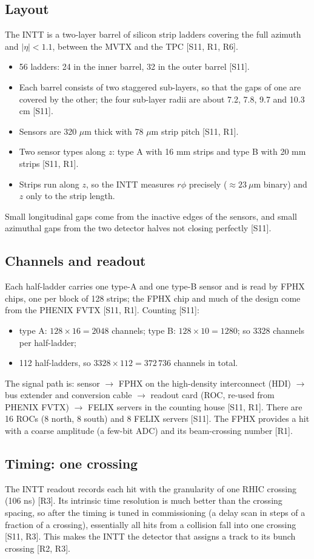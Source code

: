 \documentclass[11pt,letterpaper]{article}
\begin{document}
\subsection{Layout}
The INTT is a two-layer barrel of silicon strip ladders covering the full azimuth and $|\eta|<1.1$, between the MVTX and the TPC [S11, R1, R6].
\begin{itemize}
\item 56 ladders: 24 in the inner barrel, 32 in the outer barrel [S11].
\item Each barrel consists of two staggered sub-layers, so that the gaps of one are covered by the other; the four sub-layer radii are about 7.2, 7.8, 9.7 and 10.3 cm [S11].
\item Sensors are 320 $\mu$m thick with 78 $\mu$m strip pitch [S11, R1].
\item Two sensor types along $z$: type A with 16 mm strips and type B with 20 mm strips [S11, R1].
\item Strips run along $z$, so the INTT measures $r\phi$ precisely ($\approx23\ \mu$m binary) and $z$ only to the strip length.
\end{itemize}
Small longitudinal gaps come from the inactive edges of the sensors, and small azimuthal gaps from the two detector halves not closing perfectly [S11].

\subsection{Channels and readout}
Each half-ladder carries one type-A and one type-B sensor and is read by FPHX chips, one per block of 128 strips; the FPHX chip and much of the design come from the PHENIX FVTX [S11, R1].
Counting [S11]:
\begin{itemize}
\item type A: $128\times16=2048$ channels; type B: $128\times10=1280$; so 3328 channels per half-ladder;
\item 112 half-ladders, so $3328\times112=372\,736$ channels in total.
\end{itemize}
The signal path is: sensor $\to$ FPHX on the high-density interconnect (HDI) $\to$ bus extender and conversion cable $\to$ readout card (ROC, re-used from PHENIX FVTX) $\to$ FELIX servers in the counting house [S11, R1].
There are 16 ROCs (8 north, 8 south) and 8 FELIX servers [S11].
The FPHX provides a hit with a coarse amplitude (a few-bit ADC) and its beam-crossing number [R1].

\subsection{Timing: one crossing}
The INTT readout records each hit with the granularity of one RHIC crossing (106 ns) [R3].
Its intrinsic time resolution is much better than the crossing spacing, so after the timing is tuned in commissioning (a delay scan in steps of a fraction of a crossing), essentially all hits from a collision fall into one crossing [S11, R3].
This makes the INTT the detector that assigns a track to its bunch crossing [R2, R3].
\end{document}
